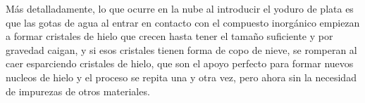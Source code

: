\documentclass[12pt,a4paper]{article}
\begin{document}
Más detalladamente, lo que ocurre en la nube al introducir el yoduro de plata es que las gotas de agua al entrar en contacto con el compuesto inorgánico empiezan a formar cristales de hielo que crecen hasta tener el tamaño suficiente y por gravedad caigan, y si esos cristales tienen forma de copo de nieve, se romperan al caer esparciendo cristales de hielo, que son el apoyo perfecto para formar nuevos nucleos de hielo y el proceso se repita una y otra vez, pero ahora sin la necesidad de impurezas de otros materiales.
\end{document}
